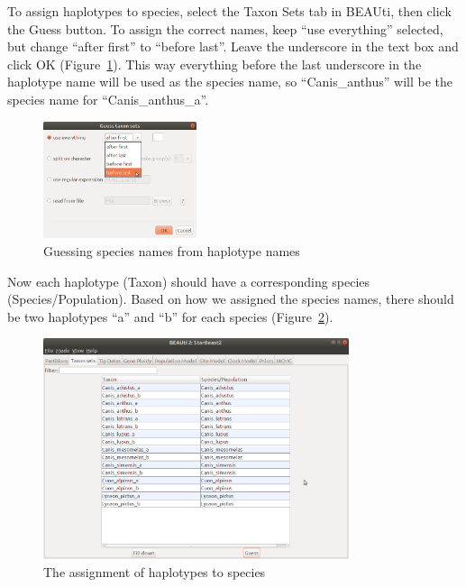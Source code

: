 \documentclass[12pt]{article}
\begin{document}
To assign haplotypes to species, select the Taxon Sets tab in BEAUti, then
click the Guess button. To assign the correct names, keep ``use everything''
selected, but change ``after first'' to ``before last''. Leave the underscore
in the text box and click OK (Figure~\ref{fig:guessTaxonMap}). This way everything before
the last underscore in the haplotype name will be used as the species name,
so ``Canis\_anthus'' will be the species name for ``Canis\_anthus\_a''.

\begin{figure}[htb!]
\centering
\includegraphics[width=0.4\textwidth]{figures/guessTaxonMap.png}
\caption
{Guessing species names from haplotype names}
\label{fig:guessTaxonMap}
\end{figure}

\newpage{}

Now each haplotype (Taxon) should have a corresponding species (Species/Population).
Based on how we assigned the species names, there should be two haplotypes
``a'' and ``b'' for each species (Figure~\ref{fig:taxonMap}).

\begin{figure}[htb!]
\centering
\includegraphics[width=0.8\textwidth]{figures/taxonMap.png}
\caption
{The assignment of haplotypes to species}
\label{fig:taxonMap}
\end{figure}

\clearpage
\end{document}
